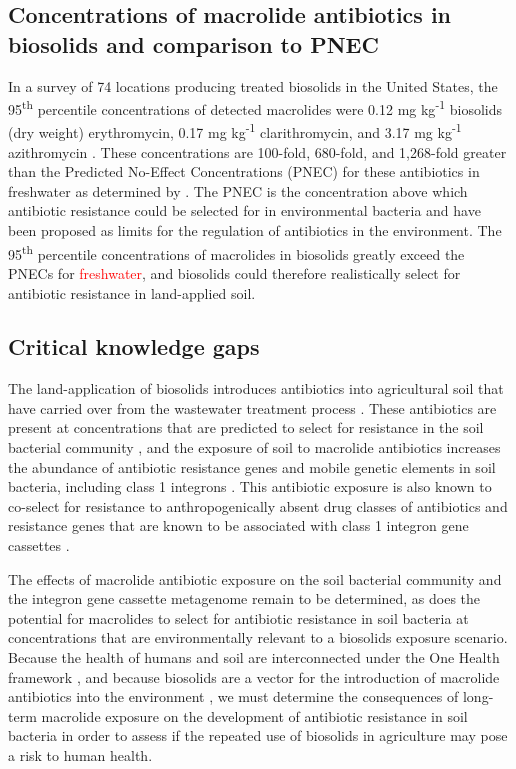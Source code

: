 \subsection{Concentrations of macrolide antibiotics in biosolids and comparison to PNEC}

In a survey of 74 locations producing treated biosolids in the United States, the 95\textsuperscript{th} percentile concentrations of detected macrolides were 0.12 mg kg\textsuperscript{-1} biosolids (dry weight) erythromycin, 0.17 mg kg\textsuperscript{-1} clarithromycin, and 3.17 mg kg\textsuperscript{-1} azithromycin \parencite{U.S.EnvironmentalProtectionAgency.2021}.
These concentrations are 100-fold, 680-fold, and 1,268-fold greater than the Predicted No-Effect Concentrations (PNEC) for these antibiotics in freshwater as determined by \cite{BengtssonPalme.2016}.
The PNEC is the concentration above which antibiotic resistance could be selected for in environmental bacteria and have been proposed as limits for the regulation of antibiotics in the environment.
The 95\textsuperscript{th} percentile concentrations of macrolides in biosolids greatly exceed the PNECs for \textcolor{red}{freshwater}, and biosolids could therefore realistically select for antibiotic resistance in land-applied soil.

\subsection{Critical knowledge gaps}

The land-application of biosolids introduces antibiotics into agricultural soil that have carried over from the wastewater treatment process \parencite{McClellan.2010, Sabourin.2012}.
These antibiotics are present at concentrations that are predicted to select for resistance in the soil bacterial community \parencite{U.S.EnvironmentalProtectionAgency.2021, BengtssonPalme.2016}, and the exposure of soil to macrolide antibiotics increases the abundance of antibiotic resistance genes and mobile genetic elements in soil bacteria, including class 1 integrons \parencite{Lau.2020}.
This antibiotic exposure is also known to co-select for resistance to anthropogenically absent drug classes of antibiotics and resistance genes that are known to be associated with class 1 integron gene cassettes \parencite{Lau.2020}.

The effects of macrolide antibiotic exposure on the soil bacterial community and the integron gene cassette metagenome remain to be determined, as does the potential for macrolides to select for antibiotic resistance in soil bacteria at concentrations that are environmentally relevant to a biosolids exposure scenario.
Because the health of humans and soil are interconnected under the One Health framework \parencite{Tiedje.2019}, and because biosolids are a vector for the introduction of macrolide antibiotics into the environment \parencite{Sabourin.2012, McClellan.2010}, we must determine the consequences of long-term macrolide exposure on the development of antibiotic resistance in soil bacteria in order to assess if the repeated use of biosolids in agriculture may pose a risk to human health.

